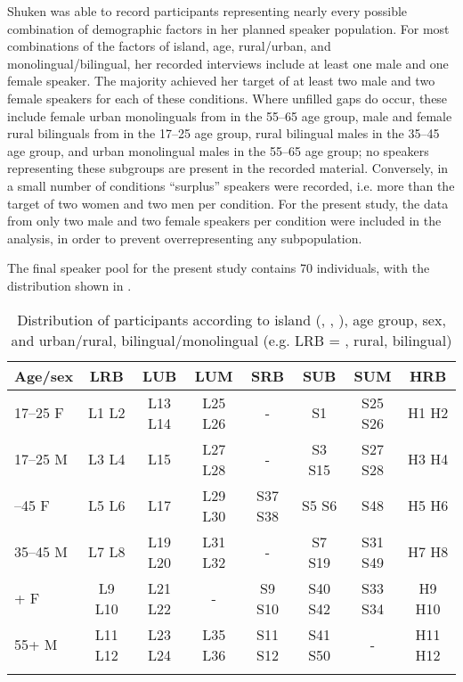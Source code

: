 \documentclass[output=paper,colorlinks,citecolor=brown]{langscibook}
\begin{document}
Shuken was able to record participants representing nearly every possible combination of demographic factors in her planned speaker population. For most combinations of the factors of island, age, rural\slash urban, and monolingual\slash bilingual, her recorded interviews include at least one male and one female speaker. The majority achieved her target of at least two male and two female speakers for each of these conditions. Where unfilled gaps do occur, these include female urban monolinguals from  in the 55--65 age group, male and female rural bilinguals from  in the 17--25 age group,  rural bilingual males in the 35--45 age group, and  urban monolingual males in the 55--65 age group; no speakers representing these subgroups are present in the recorded material. Conversely, in a small number of conditions “surplus” speakers were recorded, i.e. more than the target of two women and two men per condition. For the present study, the data from only two male and two female speakers per condition were included in the analysis, in order to prevent overrepresenting any subpopulation. 

The final speaker pool for the present study contains 70 individuals, with the distribution shown in . 

\begin{table}
\small
\begin{tabular}{l *7{c}}
\lsptoprule
{Age/sex}
& {LRB} & {LUB} & {LUM} & {SRB} & {SUB} & {SUM} & {HRB}\\
\midrule
17--25 F & L1 L2 &  L13 L14 &  L25 L26 &  - &  S1 &  S25 S26 &  H1 H2\\
17--25 M & L3 L4 &  L15 &  L27 L28 &  - &  S3 S15 &  S27 S28 &  H3 H4\\\addlinespace
35--45 F & L5 L6 &  L17 &  L29 L30 &  S37 S38 &  S5 S6 &  S48 &  H5 H6\\
35--45 M & L7 L8 &  L19 L20 &  L31 L32 &  - &  S7 S19 &  S31 S49 &  H7 H8\\\addlinespace
55+ F & L9 L10 &  L21 L22 &  - &  S9 S10 &  S40 S42 &  S33 S34 &  H9 H10\\
55+ M & L11 L12 &  L23 L24 &  L35 L36 &  S11 S12 &  S41 S50 &  - &  H11 H12\\
\lspbottomrule
\end{tabular}
\caption{Distribution of participants according to island (, , ), age group, sex,  and urban/rural, bilingual/monolingual (e.g. LRB = , rural, bilingual)}
\label{tab:clayton:1}
\end{table}
\end{document}
